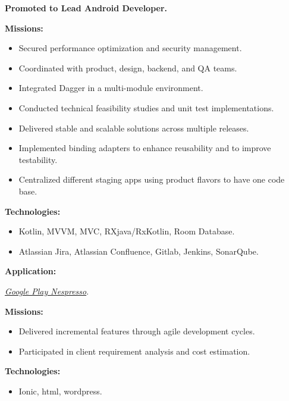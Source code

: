 \documentclass[10pt,a4paper,withhyper]{altacv}
\begin{document}
\begin{paracol}{2}
\divider


\textbf{Promoted to Lead Android Developer.}
\newline

\textbf{Missions:}
\begin{itemize}
\addtolength{\itemindent}{0.1cm}
\item Secured performance optimization and security management.
\item Coordinated with product, design, backend, and QA teams.
\item Integrated Dagger in a multi-module environment.
\item Conducted technical feasibility studies and unit test implementations.
\item Delivered stable and scalable solutions across multiple releases.
\item Implemented binding adapters to enhance reusability and to improve testability.
\item Centralized different staging apps using product flavors to have one code base.
\end{itemize}

\textbf{Technologies:}
\begin{itemize}
	\addtolength{\itemindent}{0.1cm}
	\item Kotlin, MVVM, MVC, RXjava/RxKotlin, Room Database.
	\item Atlassian Jira, Atlassian Confluence, Gitlab, Jenkins, SonarQube.
\end{itemize}
\textbf{Application:}

\href{https://play.google.com/store/apps/details?id=com.nespresso.activities&hl=en}{\textit{Google Play Nespresso}}.

\divider



\textbf{Missions:}
\begin{itemize}
	\addtolength{\itemindent}{0.1cm}
	\item Delivered incremental features through agile development cycles.
	\item Participated in client requirement analysis and cost estimation.
\end{itemize}

\textbf{Technologies:}
\begin{itemize}
	\addtolength{\itemindent}{0.1cm}
	\item Ionic, html, wordpress.
\end{itemize}


\end{paracol}
\end{document}
